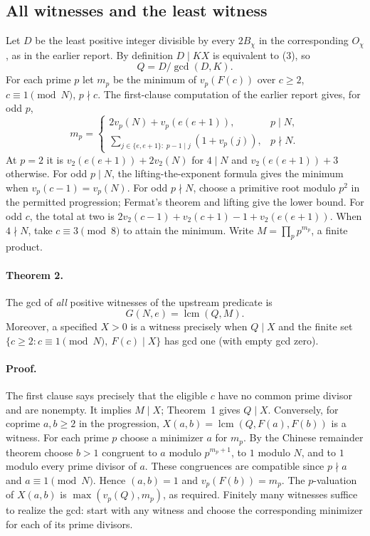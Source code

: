 \subsection{All witnesses and the least witness}

Let $D$ be the least positive integer divisible by every $2B_\chi$
in the corresponding $O_\chi$, as in the earlier report. By definition
$D\mid KX$ is equivalent to (3), so
\[
                           Q=D/\gcd(D,K).
\]
For each prime $p$ let $m_p$ be the minimum of $v_p(F(c))$ over
$c\ge2$, $c\equiv1\pmod N$, $p\nmid c$. The first-clause computation of
the earlier report gives, for odd $p$,
\[
 m_p=\begin{cases}
  2v_p(N)+v_p(e(e+1)),&p\mid N,\\
  \displaystyle\sum_{j\in\{e,e+1\}:\;p-1\mid j}(1+v_p(j)),&p\nmid N.
 \end{cases}
\]
At $p=2$ it is $v_2(e(e+1))+2v_2(N)$ for $4\mid N$ and
$v_2(e(e+1))+3$ otherwise. For odd $p\mid N$, the lifting-the-exponent
formula gives the minimum when $v_p(c-1)=v_p(N)$.
For odd $p\nmid N$, choose a primitive root modulo $p^2$ in the permitted
progression; Fermat's theorem and lifting give the lower bound.
For odd $c$, the total at two is
$2v_2(c-1)+v_2(c+1)-1+v_2(e(e+1))$. When $4\nmid N$, take
$c\equiv3\pmod8$ to attain the minimum. Write $M=\prod_p p^{m_p}$,
a finite product.

\paragraph{Theorem 2.}
The gcd of \emph{all} positive witnesses of the upstream predicate is
\[
              G(N,e)=\operatorname{lcm}(Q,M).                     \tag{5}
\]
Moreover, a specified $X>0$ is a witness precisely when $Q\mid X$
and the finite set $\{c\ge2:c\equiv1\pmod N,\ F(c)\mid X\}$ has
gcd one (with empty gcd zero).

\paragraph{Proof.}
The first clause says precisely that the eligible $c$ have no common
prime divisor and are nonempty. It implies $M\mid X$; Theorem~1 gives
$Q\mid X$. Conversely, for coprime $a,b\ge2$ in the progression,
$X(a,b)=\operatorname{lcm}(Q,F(a),F(b))$ is a witness.
For each prime $p$ choose a minimizer $a$ for $m_p$. By the Chinese
remainder theorem choose $b>1$ congruent to $a$ modulo $p^{m_p+1}$, to
$1$ modulo $N$, and to $1$ modulo every prime divisor of $a$. These
congruences are compatible since $p\nmid a$ and $a\equiv1\pmod N$.
Hence $(a,b)=1$ and $v_p(F(b))=m_p$. The $p$-valuation of $X(a,b)$
is $\max(v_p(Q),m_p)$, as required. Finitely many witnesses suffice to
realize the gcd: start with any witness and choose the corresponding
minimizer for each of its prime divisors.

